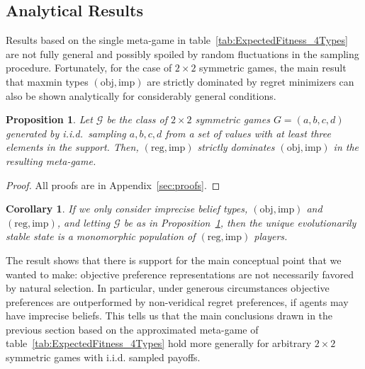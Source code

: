 \documentclass[fleqn,reqno,12pt]{article}
\theoremstyle{Satz}
\newtheorem{proposition}{Proposition}
\newtheorem{corollary}{Corollary}
\theoremstyle{Bsp}
\begin{document}
\subsection{Analytical Results}
\label{sec:analytical-results}

Results based on the single meta-game in table~\ref{tab:ExpectedFitness_4Types} are not fully general and possibly spoiled by random
fluctuations in the sampling procedure. Fortunately, for the case of $2 \times 2$ symmetric
games, the main result that maxmin types $(\text{obj}, \text{imp})$ are strictly dominated by regret minimizers can
also be shown analytically for considerably general conditions.

\begin{proposition} \label{proposition1}
  Let $\mathcal{G}$ be the class of $2 \times 2$ symmetric games $G=(a,b,c,d)$ generated by i.i.d.~sampling $a,b,c,d$ from a
  set of values with at least three elements in the support. Then,
  $(\text{reg}, \text{imp})$ strictly dominates $(\text{obj}, \text{imp})$ in the resulting
  meta-game.
\end{proposition}

\begin{proof}
All proofs are in Appendix~\ref{sec:proofs}.
\end{proof}

\begin{corollary} \label{corollary1} If we only consider imprecise belief types, $(\text{obj}, \text{imp})$ and
  $(\text{reg}, \text{imp})$, and letting $\mathcal{G}$ be as in Proposition~\ref{proposition1}, then the unique evolutionarily stable state is a monomorphic population of
  $(\text{reg}, \text{imp})$ players.
\end{corollary}

The result shows that there is support for the main conceptual
point that we wanted to make: 
objective preference representations are not necessarily favored by
natural selection. In particular, under generous circumstances objective preferences are outperformed by non-veridical regret preferences, if agents may have imprecise beliefs.
This
tells us that the main conclusions drawn in the previous section based on the approximated meta-game of table~\ref{tab:ExpectedFitness_4Types} hold more generally 
for
arbitrary $2 \times 2$ symmetric games with i.i.d. sampled payoffs.
\end{document}
